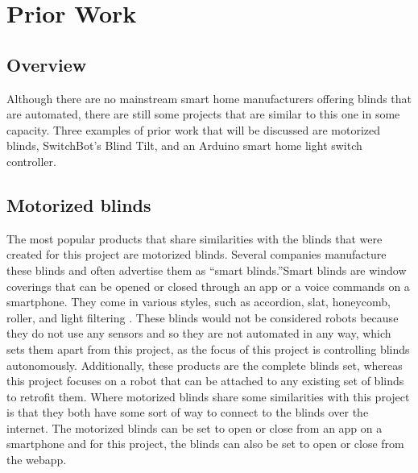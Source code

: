 \documentclass[10pt,twocolumn]{article}
\begin{document}
\section{Prior Work}
\subsection{Overview}
Although there are no mainstream smart home manufacturers offering blinds that are automated, there are still some projects that are similar to this one in some capacity. Three examples of prior work that will be discussed are motorized blinds, SwitchBot’s Blind Tilt, and an Arduino smart home light switch controller. 

\subsection{Motorized blinds}
The most popular products that share similarities with the blinds that were created for this project are motorized blinds. Several companies manufacture these blinds and often advertise them as “smart blinds.”Smart blinds are window coverings that can be opened or closed through an app or a voice commands on a smartphone. They come in various styles, such as accordion, slat, honeycomb, roller, and light filtering \cite{Alina20228BestSmartBlinds}. These blinds would not be considered robots because they do not use any sensors and so they are not automated in any way, which sets them apart from this project, as the focus of this project is controlling blinds autonomously. Additionally, these products are the complete blinds set, whereas this project focuses on a robot that can be attached to any existing set of blinds to retrofit them. Where motorized blinds share some similarities with this project is that they both have some sort of way to connect to the blinds over the internet. The motorized blinds can be set to open or close from an app on a smartphone and for this project, the blinds can also be set to open or close from the webapp.
\end{document}
